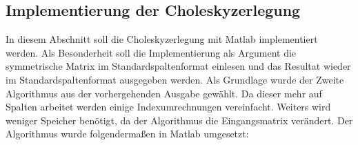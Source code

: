 \subsection{Implementierung der Choleskyzerlegung}
In diesem Abschnitt soll die Choleskyzerlegung mit Matlab implementiert werden. 
Als Besonderheit soll die Implementierung als Argument die symmetrische Matrix
im Standardspaltenformat einlesen und das Resultat wieder im Standardspaltenformat
ausgegeben werden. Als Grundlage wurde der Zweite Algorithmus aus der vorhergehenden
Ausgabe gewählt. Da dieser mehr auf Spalten arbeitet werden einige Indexumrechnungen
vereinfacht. Weiters wird weniger Speicher benötigt, da der Algorithmus die 
Eingangsmatrix verändert. Der Algorithmus wurde folgendermaßen in Matlab umgesetzt:

